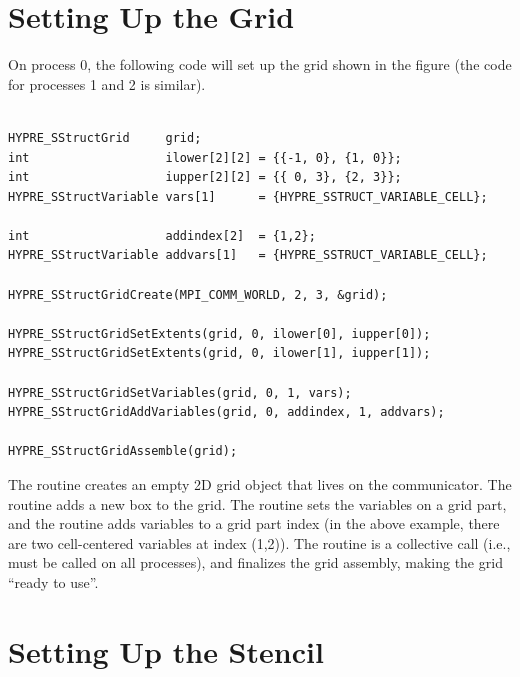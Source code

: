
\section{Setting Up the Grid}
\label{sstruct:Setting Up the Grid}

On process 0, the following code will set up the grid shown in the
figure (the code for processes 1 and 2 is similar).
\begin{display}
\begin{verbatim}

HYPRE_SStructGrid     grid;
int                   ilower[2][2] = {{-1, 0}, {1, 0}};
int                   iupper[2][2] = {{ 0, 3}, {2, 3}};
HYPRE_SStructVariable vars[1]      = {HYPRE_SSTRUCT_VARIABLE_CELL};

int                   addindex[2]  = {1,2};
HYPRE_SStructVariable addvars[1]   = {HYPRE_SSTRUCT_VARIABLE_CELL};

HYPRE_SStructGridCreate(MPI_COMM_WORLD, 2, 3, &grid);

HYPRE_SStructGridSetExtents(grid, 0, ilower[0], iupper[0]);
HYPRE_SStructGridSetExtents(grid, 0, ilower[1], iupper[1]);

HYPRE_SStructGridSetVariables(grid, 0, 1, vars);
HYPRE_SStructGridAddVariables(grid, 0, addindex, 1, addvars);

HYPRE_SStructGridAssemble(grid);

\end{verbatim}
\end{display}
The  routine creates an empty 2D grid object that lives
on the  communicator.  The 
routine adds a new box to the grid.  The  routine
sets the variables on a grid part, and the 
routine adds variables to a grid part index (in the above example,
there are two cell-centered variables at index (1,2)).  The
 routine is a collective call (i.e., must be called
on all processes), and finalizes the grid assembly, making the grid
``ready to use''.


\section{Setting Up the Stencil}
\label{sstruct:Setting Up the Stencil}

